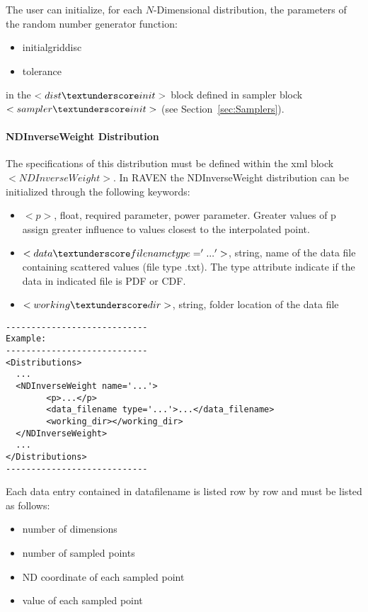 The user can initialize, for each $N$-Dimensional distribution, the parameters of the random number generator function:
\begin{itemize}
\item initial\textunderscore grid\textunderscore disc 
\item tolerance
\end{itemize}
in the $<dist\textunderscore init>$ block defined in sampler block $<sampler\textunderscore init>$ (see Section~\ref{sec:Samplers}). 

\paragraph{NDInverseWeight Distribution}
\label{NDInverseWeight}

The specifications of this distribution must be defined within the xml block $<NDInverseWeight>$.  In RAVEN the NDInverseWeight distribution can be initialized through the following keywords:
\begin{itemize}
\item $<p>$, float, required parameter, power parameter. Greater values of p assign greater influence to values closest to the interpolated point.
\item $<data\textunderscore filename   type='...' >$, string,  name of the data file containing scattered values (file type .txt). The type attribute indicate if the data in indicated file is PDF or CDF. 
\item $<working\textunderscore dir>$, string, folder location of the data file
\end{itemize}

\begin{lstlisting}[style=XML]
----------------------------
Example:
----------------------------
<Distributions>
  ...
  <NDInverseWeight name='...'>
        <p>...</p>
        <data_filename type='...'>...</data_filename>
        <working_dir></working_dir>
  </NDInverseWeight>
  ...
</Distributions>
----------------------------
\end{lstlisting}

Each data entry contained in data\textunderscore filename is listed row by row and must be listed as follows:
\begin{itemize}
\item number of dimensions
\item number of sampled points
\item ND coordinate of each sampled point
\item value of each sampled point
\end{itemize}

